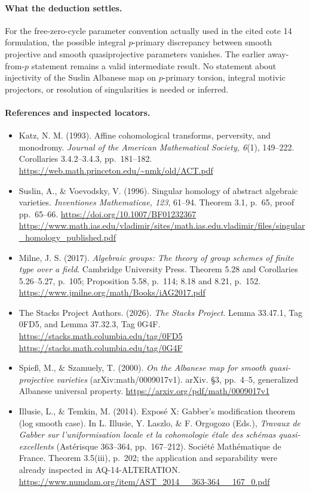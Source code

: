 \documentclass[11pt,a4paper]{article}
\theoremstyle{definition}\newtheorem{definition}[theorem]{Definition}
\theoremstyle{remark}\newtheorem{remark}[theorem]{Remark}
\begin{document}
\paragraph{What the deduction settles.}
For the free-zero-cycle parameter convention actually
used in the cited cote 14 formulation, the possible
integral $p$-primary discrepancy between smooth
projective and smooth quasiprojective parameters
vanishes.  The earlier away-from-$p$ statement remains
a valid intermediate result.  No statement about
injectivity of the Suslin Albanese map on
$p$-primary torsion, integral motivic projectors,
or resolution of singularities is needed or inferred.

\paragraph{References and inspected locators.}
\begin{itemize}
\item Katz, N. M. (1993). Affine cohomological
transforms, perversity, and monodromy.
\emph{Journal of the American Mathematical Society,
6}(1), 149--222. Corollaries 3.4.2--3.4.3,
pp.~181--182.
\url{https://web.math.princeton.edu/~nmk/old/ACT.pdf}
\item Suslin, A., \& Voevodsky, V. (1996).
Singular homology of abstract algebraic varieties.
\emph{Inventiones Mathematicae, 123}, 61--94.
Theorem 3.1, p.~65, proof pp.~65--66.
\url{https://doi.org/10.1007/BF01232367}
\url{https://www.math.ias.edu/vladimir/sites/math.ias.edu.vladimir/files/singular_homology_published.pdf}
\item Milne, J. S. (2017). \emph{Algebraic groups:
The theory of group schemes of finite type over a
field}. Cambridge University Press.
Theorem 5.28 and Corollaries 5.26--5.27, p.~105;
Proposition 5.58, p.~114; 8.18 and 8.21, p.~152.
\url{https://www.jmilne.org/math/Books/iAG2017.pdf}
\item The Stacks Project Authors. (2026).
\emph{The Stacks Project}. Lemma 33.47.1,
Tag 0FD5, and Lemma 37.32.3, Tag 0G4F.
\url{https://stacks.math.columbia.edu/tag/0FD5}
\url{https://stacks.math.columbia.edu/tag/0G4F}
\item Spie{\ss}, M., \& Szamuely, T. (2000).
\emph{On the Albanese map for smooth quasi-projective
varieties} (arXiv:math/0009017v1). arXiv.
\S3, pp.~4--5, generalized Albanese universal property.
\url{https://arxiv.org/pdf/math/0009017v1}
\item Illusie, L., \& Temkin, M. (2014).
Expos\'e X: Gabber's modification theorem
(log smooth case).
In L. Illusie, Y. Laszlo, \& F. Orgogozo (Eds.),
\emph{Travaux de Gabber sur l'uniformisation locale
et la cohomologie \'{e}tale des sch\'emas
quasi-excellents} (Ast\'erisque 363--364,
pp.~167--212). Soci\'et\'e Math\'ematique de France.
Theorem 3.5(iii), p.~202; the application and
separability were already inspected in
AQ-14-ALTERATION.
\url{https://www.numdam.org/item/AST_2014__363-364__167_0.pdf}
\end{itemize}
\end{document}
